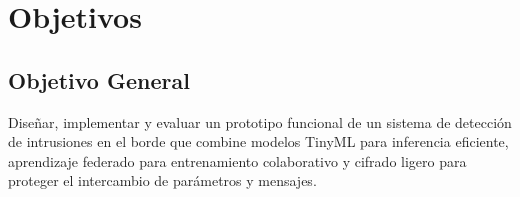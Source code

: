 \section{Objetivos}

\subsection{Objetivo General}

Diseñar, implementar y evaluar un prototipo funcional de un sistema de detección de intrusiones en el borde que combine modelos TinyML para inferencia eficiente, aprendizaje federado para entrenamiento colaborativo y cifrado ligero para proteger el intercambio de parámetros y mensajes.

